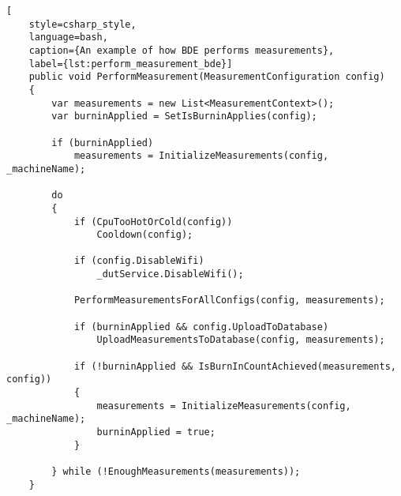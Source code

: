 \begin{lstlisting}[
    style=csharp_style,
    language=bash, 
    caption={An example of how BDE performs measurements},
    label={lst:perform_measurement_bde}]
    public void PerformMeasurement(MeasurementConfiguration config)
    {
        var measurements = new List<MeasurementContext>();
        var burninApplied = SetIsBurninApplies(config);

        if (burninApplied)
            measurements = InitializeMeasurements(config, _machineName);

        do
        {
            if (CpuTooHotOrCold(config))
                Cooldown(config);

            if (config.DisableWifi)
                _dutService.DisableWifi();

            PerformMeasurementsForAllConfigs(config, measurements);

            if (burninApplied && config.UploadToDatabase)
                UploadMeasurementsToDatabase(config, measurements);

            if (!burninApplied && IsBurnInCountAchieved(measurements, config))
            {
                measurements = InitializeMeasurements(config, _machineName);
                burninApplied = true;
            }

        } while (!EnoughMeasurements(measurements));
    }
\end{lstlisting}